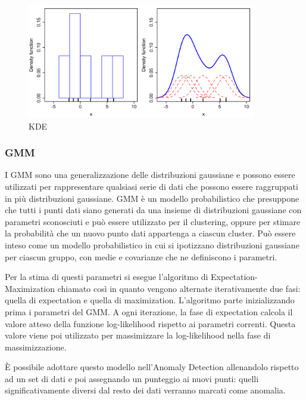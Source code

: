 \begin{figure}[t]
	\centering
	\includegraphics[width=10cm, scale=1]{images/kde_model}
	\caption{KDE}
	\label{kde_model}
\end{figure}


\subsubsection{GMM}
I GMM \cite{aggarwal2015outlier} sono una generalizzazione delle distribuzioni gaussiane e possono essere utilizzati per rappresentare qualsiasi serie di dati che possono essere raggruppati in più distribuzioni gaussiane. GMM è un modello probabilistico che presuppone che tutti i punti dati siano generati da una insieme di distribuzioni gaussiane con parametri sconosciuti e può essere utilizzato per il clustering, oppure per stimare la probabilità che un nuovo punto dati appartenga a ciascun cluster. Può essere inteso come un modello probabilistico in cui si ipotizzano distribuzioni gaussiane per ciascun gruppo, con medie e covarianze che ne definiscono i parametri.

Per la stima di questi parametri si esegue l'algoritmo di Expectation-Maximization chiamato così in quanto vengono alternate iterativamente due fasi: quella di expectation e quella di maximization. L'algoritmo parte inizializzando prima i parametri del GMM. A ogni iterazione, la fase di expectation calcola il valore atteso della funzione log-likelihood rispetto ai parametri correnti. Questa valore viene poi utilizzato per massimizzare la log-likelihood nella fase di massimizzazione.

È possibile adottare questo modello nell'Anomaly Detection allenandolo rispetto ad un set di dati e poi assegnando un punteggio ai nuovi punti: quelli significativamente diversi dal resto dei dati verranno marcati come anomalia.

